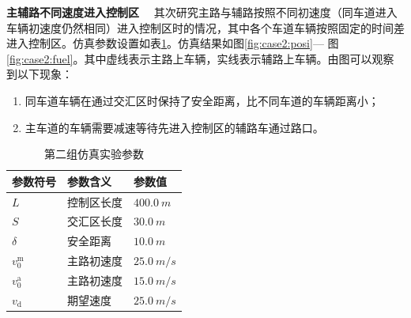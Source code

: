\textbf{主辅路不同速度进入控制区}
\label{ssec:diffv}
\ \ 其次研究主路与辅路按照不同初速度（同车道进入车辆初速度仍然相同）进入控制区时的情况，其中各个车道车辆按照固定的时间差进入控制区。仿真参数设置如表\ref{tab:case2:param}。仿真结果如图\ref{fig:case2:posi}--- 图\ref{fig:case2:fuel}。其中虚线表示主路上车辆，实线表示辅路上车辆。由图可以观察到以下现象：
\begin{enumerate}[label=(\arabic*), wide=\parindent]
\item 同车道车辆在通过交汇区时保持了安全距离，比不同车道的车辆距离小；
\item 主车道的车辆需要减速等待先进入控制区的辅路车通过路口。
\end{enumerate}
\begin{table}[htbp]
\centering
\caption{第二组仿真实验参数}
\label{tab:case2:param}
\begin{tabular}{lll}
\toprule[1.5pt]
参数符号 & 参数含义 & 参数值 \\
\midrule[1pt]
$L$ & 控制区长度 & $\SI{400.0}{m}$ \\
$S$ & 交汇区长度 & $\SI{30.0}{m}$ \\
$\delta$ & 安全距离 & $\SI{10.0}{m}$ \\
$v_0^\mathrm{m}$ & 主路初速度 & $\SI{25.0}{m\per s}$ \\
$v_0^\mathrm{a}$ & 主路初速度 & $\SI{15.0}{m\per s}$ \\
$v_\mathrm{d}$ & 期望速度 & $\SI{25.0}{m\per s}$ \\
\bottomrule[1.5pt]
\end{tabular}
\end{table}

